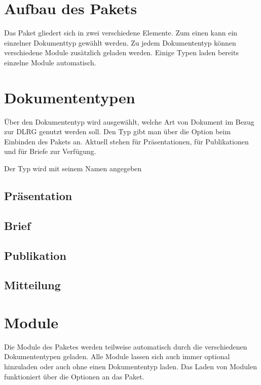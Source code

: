 \documentclass[
    a4paper,
    12pt,
    parskip=half,
    bibliography=totoc,
]{scrartcl}
\begin{document}
\section{Aufbau des Pakets}
    Das Paket gliedert sich in zwei verschiedene Elemente. Zum einen kann ein einzelner Dokumenttyp gewählt werden. Zu jedem Dokumententyp können verschiedene Module zusätzlich geladen werden. Einige Typen laden bereits einzelne Module automatisch.

\section{Dokumententypen}
    Über den Dokumententyp wird ausgewählt, welche Art von Dokument im Bezug zur DLRG genutzt werden soll. Den Typ gibt man über die Option  beim Einbinden des Pakets an. Aktuell stehen  für Präsentationen,  für Publikationen und  für Briefe zur Verfügung.
    \begin{options}
        \Default Der Typ wird mit seinem Namen angegeben
    \end{options}

\begin{sourcecode}
    \usepackage[
        typ=beamer
    ]{dlrg}
\end{sourcecode}

    \subsection{Präsentation}
        

    \subsection{Brief}
        

    \subsection{Publikation}
        

    \subsection{Mitteilung}
        

\section{Module}
    Die Module des Paketes werden teilweise automatisch durch die verschiedenen Dokumententypen geladen. Alle Module lassen sich auch immer optional hinzuladen oder auch ohne einen Dokumententyp laden. Das Laden von Modulen funktioniert über die Optionen an das Paket.
\end{document}
